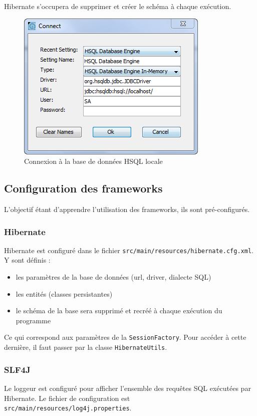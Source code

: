 \documentclass[small,algo]{dushClass}
\begin{document}
Hibernate s'occupera de supprimer et créer le schéma à chaque exécution.

\begin{figure}[ht]\label{hsqldb-connect}
	\center
	\includegraphics{images/hsqldb_connect.png}
	\caption{Connexion à la base de données HSQL locale}
\end{figure}


\subsection{Configuration des frameworks}

L'objectif étant d'apprendre l'utilisation des frameworks, ils sont pré-configurés.

\subsubsection{Hibernate}

Hibernate est configuré dans le fichier \texttt{src/main/resources/hibernate.cfg.xml}. Y sont définis :
\begin{itemize}
\item les paramètres de la base de données (url, driver, dialecte SQL)
\item les entités (classes persistantes)
\item le schéma de la base sera supprimé et recréé à chaque exécution du programme\\
\end{itemize}

Ce qui correspond aux paramètres de la \texttt{SessionFactory}. Pour accéder à cette dernière, il faut passer par la classe \texttt{HibernateUtils}.

\subsubsection{SLF4J}
Le loggeur est configuré pour afficher l'ensemble des requêtes SQL exécutées par Hibernate. Le fichier de configuration est \texttt{src/main/resources/log4j.properties}.
\end{document}
